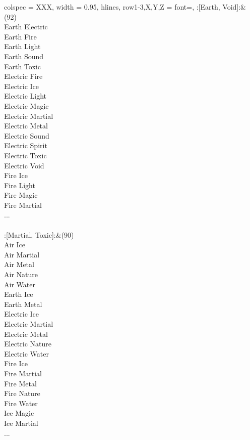 \begin{longtblr}[
	caption = {2v2 Attacking Effective},
	label = {2v2-Attacking-Effective},
]{
	colspec = {XXX}, width = 0.95\linewidth,
	hlines,
	row{1-3,X,Y,Z} = {font=\bfseries},
}
	:[Earth, Void]:&{(92)\\
	Earth Electric \\
	Earth Fire \\
	Earth Light \\
	Earth Sound \\
	Earth Toxic \\
	Electric Fire \\
	Electric Ice \\
	Electric Light \\
	Electric Magic \\
	Electric Martial \\
	Electric Metal \\
	Electric Sound \\
	Electric Spirit \\
	Electric Toxic \\
	Electric Void \\
	Fire Ice \\
	Fire Light \\
	Fire Magic \\
	Fire Martial \\
	...\\
	}\\

	:[Martial, Toxic]:&{(90)\\
	Air Ice \\
	Air Martial \\
	Air Metal \\
	Air Nature \\
	Air Water \\
	Earth Ice \\
	Earth Metal \\
	Electric Ice \\
	Electric Martial \\
	Electric Metal \\
	Electric Nature \\
	Electric Water \\
	Fire Ice \\
	Fire Martial \\
	Fire Metal \\
	Fire Nature \\
	Fire Water \\
	Ice Magic \\
	Ice Martial \\
	...\\
	}\\


\end{longtblr}
